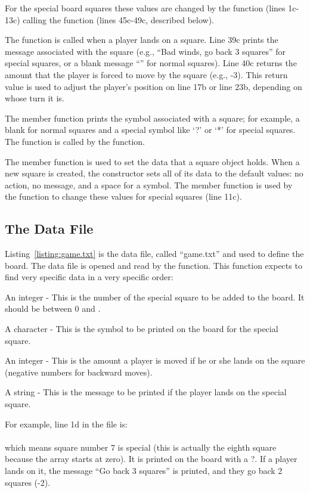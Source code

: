 For the special board squares these values are changed by the  function (lines 1c-13c) calling the  function (lines 45c-49c, described below).


The  function is called when a player lands on a square.  Line 39c prints the message associated with the square (e.g., ``Bad winds, go back 3 squares'' for special squares, or a blank message ``'' for normal squares).  Line 40c returns the amount that the player is forced to move by the square (e.g., -3).  This return value is used to adjust the player's position on line 17b or line 23b, depending on whose turn it is.


The  member function prints the symbol associated with a square; for example, a blank for normal squares and a special symbol like `?' or `*' for special squares.  The function is called by the  function.


The  member function is used to set the data that a square object holds.  When a new square is created, the constructor sets all of its data to the default values: no action, no message, and a space for a symbol.  The  member function is used by the  function to change these values for special squares (line 11c).

\subsection{The Data File}

Listing~\ref{listing:game.txt} is the data file, called ``game.txt'' and used to define the board.  The data file is opened and read by the  function.  This function expects to find very specific data in a very specific order:
\begin{tight_itemize}
\item An integer - This is the number of the special square to be added to the board. It should be between 0 and .
\item A character - This is the symbol to be printed on the board for the special square.
\item An integer - This is the amount a player is moved if he or she lands on the square (negative numbers for backward moves).
\item A string - This is the message to be printed if the player lands on the special square.
\end{tight_itemize}
For example, line 1d in the file is:\\
\\
which means square number 7 is special (this is actually the eighth square because the array starts  at zero).  It is printed on the board with a ?.  If a player lands on it, the message ``Go back 3 squares'' is printed, and they go back 2 squares (-2).  

